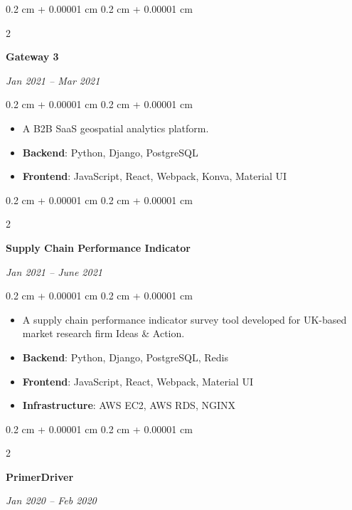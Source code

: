 \documentclass[10pt, a4paper]{article}
\newenvironment{highlights}{
    \begin{itemize}[
        topsep=0.10 cm,
        parsep=0.10 cm,
        partopsep=0pt,
        itemsep=0pt,
        leftmargin=0.4 cm + 10pt
    ]
}{
    \end{itemize}
} %
\newenvironment{onecolentry}{
    \begin{adjustwidth}{
        0.2 cm + 0.00001 cm
    }{
        0.2 cm + 0.00001 cm
    }
}{
    \end{adjustwidth}
} %
\newenvironment{twocolentry}[2][]{
    \onecolentry
    \def\secondColumn{#2}
    \setcolumnwidth{\fill, 4.5 cm}
    \begin{paracol}{2}
}{
    \switchcolumn \raggedleft \secondColumn
    \end{paracol}
    \endonecolentry
} %
\begin{document}
        \vspace{0.2 cm}

        \begin{twocolentry}{
            
            
        \textit{Jan 2021 – Mar 2021}}
            \textbf{Gateway 3}
        \end{twocolentry}

        \vspace{0.10 cm}
        \begin{onecolentry}
            \begin{highlights}
                \item A B2B SaaS geospatial analytics platform.
                \item \textbf{Backend}: Python, Django, PostgreSQL
                \item \textbf{Frontend}: JavaScript, React, Webpack, Konva, Material UI
            \end{highlights}
        \end{onecolentry}


        \vspace{0.2 cm}

        \begin{twocolentry}{
            
            
        \textit{Jan 2021 – June 2021}}
            \textbf{Supply Chain Performance Indicator}
        \end{twocolentry}

        \vspace{0.10 cm}
        \begin{onecolentry}
            \begin{highlights}
                \item A supply chain performance indicator survey tool developed for UK-based market research firm Ideas \& Action.
                \item \textbf{Backend}: Python, Django, PostgreSQL, Redis
                \item \textbf{Frontend}: JavaScript, React, Webpack, Material UI
                \item \textbf{Infrastructure}: AWS EC2, AWS RDS, NGINX
            \end{highlights}
        \end{onecolentry}


        \vspace{0.2 cm}

        \begin{twocolentry}{
            
            
        \textit{Jan 2020 – Feb 2020}}
            \textbf{PrimerDriver}
        \end{twocolentry}
\end{document}
